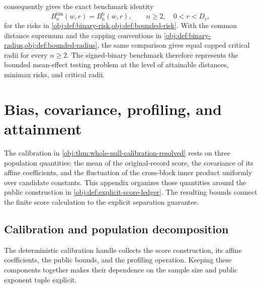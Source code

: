 \documentclass[11pt]{article}
\begin{document}
 consequently gives the exact benchmark identity
\[
B_n^{\mathrm{bin}}(w,r)=B_n^{\mathrm b}(w,r),
\qquad n\ge2,\quad 0<r<D_v,
\]
for the risks in \cref{obj:def:binary-risk,obj:def:bounded-risk}. With the common distance supremum and the capping conventions in \cref{obj:def:binary-radius,obj:def:bounded-radius}, the same comparison gives equal capped critical radii for every \(n\ge2\). The signed-binary benchmark therefore represents the bounded mean-effect testing problem at the level of attainable distances, minimax risks, and critical radii.


\section{Bias, covariance, profiling, and attainment}

The calibration in \cref{obj:thm:whole-null-calibration-resolved} rests on three population quantities: the mean of the original-record score, the covariance of its affine coefficients, and the fluctuation of the cross-block inner product uniformly over candidate constants. This appendix organizes those quantities around the public construction in \cref{obj:def:explicit-score-ledger}. The resulting bounds connect the finite score calculation to the explicit separation guarantee.

\subsection{Calibration and population decomposition}

The deterministic calibration handle collects the score construction, its affine coefficients, the public bounds, and the profiling operation. Keeping these components together makes their dependence on the sample size and public exponent tuple explicit.
\end{document}
